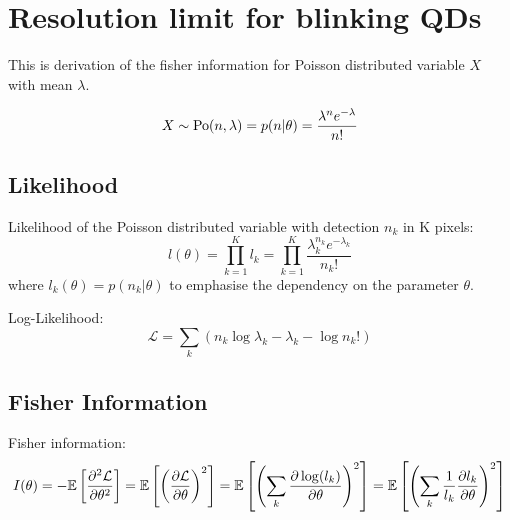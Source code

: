 \chapter{Resolution limit for blinking QDs\label{app:Resolution limit for the blinking QDs}}


This is derivation of the fisher information for Poisson distributed
variable $X$ with mean $\lambda$.

\begin{equation}
X\sim\mathrm{Po}(n,\lambda)=p(n|\theta)=\frac{\lambda^{n}e^{-\lambda}}{n!}
\end{equation}



\section{Likelihood}

Likelihood of the Poisson distributed variable with detection $n_k$ in K pixels: 
%
\begin{equation}
	l(\theta)=\prod_{k=1}^Kl_k=\prod_{k=1}^K\frac{\lambda_k^{n_k}e^{-\lambda_k}}{n_k!}\label{eq:Likelihood of Poisson}
\end{equation}
%
where $l_k(\theta)=p(n_k|\theta)$ to emphasise the dependency on the parameter $\theta$.

Log-Likelihood:
\begin{equation}
	\mathcal{L}=\sum_k\left(n_k\log\lambda_k-\lambda_k-\log n_k!\right)
\end{equation}


\section{Fisher Information}

Fisher information:
\begin{equation}
	I(\theta)=-\mathbb{E}\left[\frac{\partial^2\mathcal{L}}{\partial\theta^2}\right]=\mathbb{E}\left[\left(\frac{\partial\mathcal{L}}{\partial\theta}\right)^2\right]=\mathbb{E}\left[\left(\sum_k\frac{\partial\log(l_k)}{\partial\theta}\right)^2\right]=\mathbb{E}\left[\left(\sum_k\frac{1}{l_k}\frac{\partial l_k}{\partial\theta}\right)^2\right]\label{eq:Fisher Info Definition}
\end{equation}


